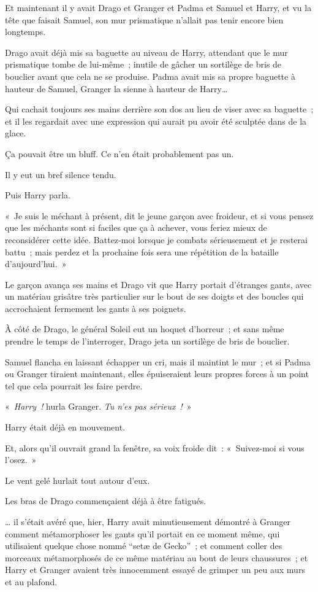 Et maintenant il y avait Drago et Granger et Padma et Samuel et Harry, et vu la tête que faisait Samuel, son mur prismatique n'allait pas tenir encore bien longtemps.

Drago avait déjà mis sa baguette au niveau de Harry, attendant que le mur prismatique tombe de lui-même~; inutile de gâcher un sortilège de bris de bouclier avant que cela ne se produise.
Padma avait mis sa propre baguette à hauteur de Samuel, Granger la sienne à hauteur de Harry…

Qui cachait toujours ses mains derrière son dos au lieu de viser avec sa baguette~; et il les regardait avec une expression qui aurait pu avoir été sculptée dans de la glace.

Ça pouvait être un bluff.
Ce n'en était probablement pas un.

Il y eut un bref silence tendu.

Puis Harry parla.

«~Je suis le méchant à présent, dit le jeune garçon avec froideur, et si vous pensez que les méchants sont si faciles que ça à achever, vous feriez mieux de reconsidérer cette idée.
Battez-moi lorsque je combats sérieusement et je resterai battu~; mais perdez et la prochaine fois sera une répétition de la bataille d'aujourd'hui.~»

Le garçon avança ses mains et Drago vit que Harry portait d'étranges gants, avec un matériau grisâtre très particulier sur le bout de ses doigts et des boucles qui accrochaient fermement les gants à ses poignets.

À côté de Drago, le général Soleil eut un hoquet d'horreur~; et sans même prendre le temps de l'interroger, Drago jeta un sortilège de bris de bouclier.

Samuel flancha en laissant échapper un cri, mais il maintint le mur~; et si Padma ou Granger tiraient maintenant, elles épuiseraient leurs propres forces à un point tel que cela pourrait les faire perdre.

«~\emph{Harry~!} hurla Granger.
\emph{Tu n'es pas sérieux~!}~»

Harry était déjà en mouvement.

Et, alors qu'il ouvrait grand la fenêtre, sa voix froide dit~: «~Suivez-moi si vous l'osez.~»

\later

Le vent gelé hurlait tout autour d'eux.

Les bras de Drago commençaient déjà à être fatigués.

… il s'était avéré que, hier, Harry avait minutieusement démontré à Granger comment métamorphoser les gants qu'il portait en ce moment même, qui utilisaient quelque chose nommé “setæ de Gecko”~; et comment coller des morceaux métamorphosés de ce même matériau au bout de leurs chaussures~; et Harry et Granger avaient très innocemment essayé de grimper un peu aux murs et au plafond.

